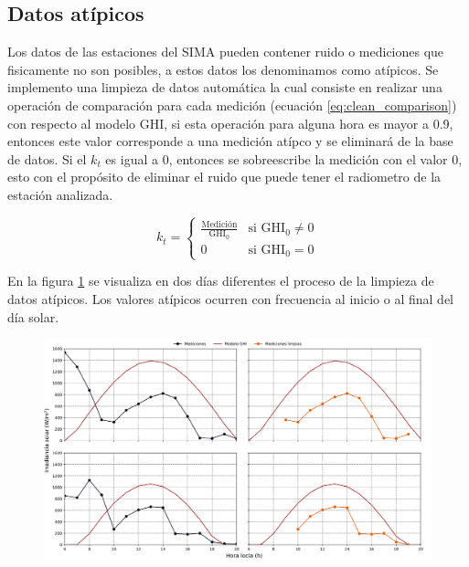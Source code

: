 \subsection{Datos atípicos}

Los datos de las estaciones del SIMA pueden contener ruido o mediciones que fisicamente no son posibles, a estos datos los denominamos como atípicos. Se implemento una limpieza de datos automática la cual consiste en realizar una operación de comparación para cada medición (ecuación \ref{eq:clean_comparison}) con respecto al modelo GHI, si esta operación para alguna hora es mayor a 0.9, entonces este valor corresponde a una medición atípco y se eliminará de la base de datos. Si el $k_t$ es igual a 0, entonces se sobreescribe la medición con el valor 0, esto con el propósito de eliminar el ruido que puede tener el radiometro de la estación analizada.

\begin{equation}
	k_t =\begin{cases}
		\frac{\text{Medición}}{\text{GHI}_0} & \text{si GHI}_0\neq 0 \\
		0                                    & \text{si GHI}_0 = 0
	\end{cases}
	\label{eq:clean_comparison}
\end{equation}

En la figura \ref{fig:example_clean_data} se visualiza en dos días diferentes el proceso de la limpieza de datos atípicos. Los valores atípicos ocurren con frecuencia al inicio o al final del día solar.

\begin{figure}[H]
	\centering
	\includegraphics[width=15cm]{Graphics/example_clean_data.png}
	\caption{}
	\label{fig:example_clean_data}
\end{figure}

